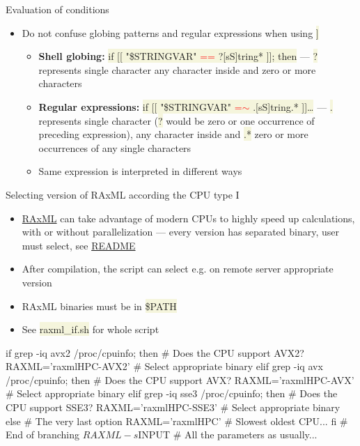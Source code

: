 \documentclass[compress, xelatex, 11pt, xcolor=svgnames, aspectratio=169,
	hyperref={
		bookmarks=true,
		unicode=true,
		colorlinks=true,
		pdftitle={Linux, command line and MetaCentrum},
		plainpages=false,
		pdfauthor={Vojtech Zeisek},
		pdfsubject={Course about use of Linux command line, writing shell scripts and using MetaCentrum of CESNET},
		pdfcreator={XeLaTeX},
		pdfkeywords={Linux, GNU, BASH, shell, command line, MetaCentrum},
		linkcolor=DarkRed, %
		anchorcolor=DarkBlue, %
		citecolor=Indigo, %
		filecolor=NavyBlue, %
		menucolor=DarkMagenta, %
		urlcolor=DarkBlue, %
		},
	url={hyphens, lowtilde} %
	]{beamer}
\renewcommand{\texttt}[1]{\colorbox{Beige}{{\ttfamily #1}}}
\renewcommand{\alert}[1]{\textcolor{red}{#1}}
\begin{document}
\begin{frame}[allowframebreaks]{Evaluation of conditions}
\begin{itemize}
		\item Do not confuse globing patterns and regular expressions when using \texttt{[[~\ldots~]]}
		\begin{itemize}
			\item \textbf{Shell globing:} \texttt{if [[ "\$\textbraceleft STRINGVAR\textbraceright " \alert{==} ?[sS]tring* ]]; then} --- \texttt{?} represents single character \texttt{[]} any character inside and \texttt{*} zero or more characters
			\item \textbf{Regular expressions:} \texttt{if [[ "\$\textbraceleft STRINGVAR\textbraceright " \alert{=$\sim$} .[sS]tring.* ]]\ldots} --- \texttt{.} represents single character (\texttt{?} would be zero or one occurrence of preceding expression), \texttt{[]} any character inside and \texttt{.*} zero or more occurrences of any single characters
			\item Same expression is interpreted in different ways
		\end{itemize}
	\end{itemize}
\end{frame}

\begin{frame}[fragile]{Selecting version of RAxML according the CPU type I} %
	\begin{itemize}
		\item \href{https://github.com/stamatak/standard-RAxML}{RAxML} can take advantage of modern CPUs to highly speed up calculations, with or without parallelization --- every version has separated binary, user must select, see \href{https://github.com/stamatak/standard-RAxML/blob/master/README.md}{README}
		\item After compilation, the script can select e.g. on remote server appropriate version
		\item RAxML binaries must be in \texttt{\$PATH}
		\item See \texttt{raxml\_if.sh} for whole script
	\end{itemize}
	\vfill
	\begin{bashcode}
    if grep -iq avx2 /proc/cpuinfo; then # Does the CPU support AVX2?
      RAXML='raxmlHPC-AVX2' # Select appropriate binary
      elif grep -iq avx /proc/cpuinfo; then # Does the CPU support AVX?
        RAXML='raxmlHPC-AVX' # Select appropriate binary
        elif grep -iq sse3 /proc/cpuinfo; then # Does the CPU support SSE3?
          RAXML='raxmlHPC-SSE3' # Select appropriate binary
          else # The very last option
            RAXML='raxmlHPC' # Slowest oldest CPU...
      fi # End of branching
    ${RAXML} -s ${INPUT} # All the parameters as usually...
	\end{bashcode}
\end{frame}
\end{document}
